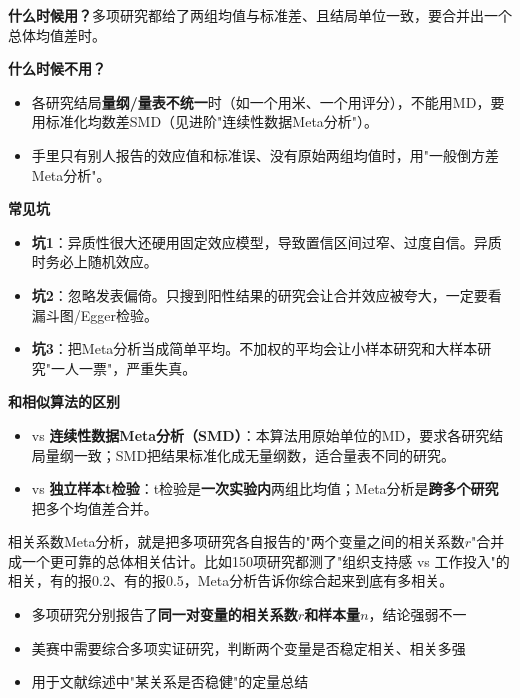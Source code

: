 \begin{algonotes}
\textbf{什么时候用？}多项研究都给了两组均值与标准差、且结局单位一致，要合并出一个总体均值差时。

\textbf{什么时候不用？}
\begin{itemize}
    \item 各研究结局\textbf{量纲/量表不统一}时（如一个用米、一个用评分），不能用MD，要用标准化均数差SMD（见进阶"连续性数据Meta分析"）。
    \item 手里只有别人报告的效应值和标准误、没有原始两组均值时，用"一般倒方差Meta分析"。
\end{itemize}

\textbf{常见坑}
\begin{itemize}
    \item \textbf{坑1}：异质性很大还硬用固定效应模型，导致置信区间过窄、过度自信。异质时务必上随机效应。
    \item \textbf{坑2}：忽略发表偏倚。只搜到阳性结果的研究会让合并效应被夸大，一定要看漏斗图/Egger检验。
    \item \textbf{坑3}：把Meta分析当成简单平均。不加权的平均会让小样本研究和大样本研究"一人一票"，严重失真。
\end{itemize}

\textbf{和相似算法的区别}
\begin{itemize}
    \item vs \textbf{连续性数据Meta分析（SMD）}：本算法用原始单位的MD，要求各研究结局量纲一致；SMD把结果标准化成无量纲数，适合量表不同的研究。
    \item vs \textbf{独立样本t检验}：t检验是\textbf{一次实验内}两组比均值；Meta分析是\textbf{跨多个研究}把多个均值差合并。
\end{itemize}
\end{algonotes}


\begin{algointro}
相关系数Meta分析，就是把多项研究各自报告的"两个变量之间的相关系数$r$"合并成一个更可靠的总体相关估计。比如150项研究都测了"组织支持感 vs 工作投入"的相关，有的报0.2、有的报0.5，Meta分析告诉你综合起来到底有多相关。
\end{algointro}

\begin{algoscene}
\begin{itemize}
    \item 多项研究分别报告了\textbf{同一对变量的相关系数$r$和样本量$n$}，结论强弱不一
    \item 美赛中需要综合多项实证研究，判断两个变量是否稳定相关、相关多强
    \item 用于文献综述中"某关系是否稳健"的定量总结
\end{itemize}
\end{algoscene}

